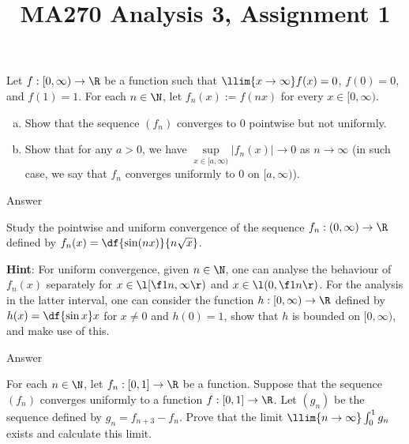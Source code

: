 \documentclass[a4paper]{article}
\title{MA270 Analysis 3, Assignment 1}
\begin{document}
\maketitle

\setlength{\parindent}{0em}
\setlength{\parskip}{1em}


\begin{questionbody}
Let $f : [0, \infty) \to \R$ be a function such that $\llim{x \to \infty} f(x) = 0$, $f(0) = 0$, and $f(1) = 1$. For each $n \in \N$, let $f_n(x) := f(nx)$ for every $x \in [0, \infty)$. %
\begin{enumerate}[(a)]
    \item Show that the sequence $(f_n)$ converges to 0 pointwise but not uniformly.
    \item Show that for any $a > 0$, we have $\sup\limits_{x \in [a, \infty)} |f_n(x)| \to 0$ as $n \to \infty$ (in such case, we say that $f_n$ converges uniformly to 0 on $[a, \infty)$). %
\end{enumerate}
\end{questionbody}

Answer



\begin{questionbody}
Study the pointwise and uniform convergence of the sequence $f_n : (0, \infty) \to \R$ defined by $f_n(x) = \df{\sin(nx)}{n \sqrt x}$.

\textbf{Hint}: For uniform convergence, given $n \in \N$, one can analyse the behaviour of $f_n(x)$ separately for $x \in \l[ \f1n, \infty \r)$ and $x \in \l( 0, \f1n \r)$. For the analysis in the latter interval, one can consider the function $h : [0, \infty) \to \R$ defined by $h(x) = \df{\sin x}x$ for $x \ne 0$ and $h(0) = 1$, show that $h$ is bounded on $[0, \infty)$, and make use of this. %
\end{questionbody}

Answer



\begin{questionbody}
For each $n \in \N$, let $f_n : [0, 1] \to \R$ be a function. Suppose that the sequence $(f_n)$ converges uniformly to a function $f : [0, 1] \to \R$. Let $(g_n)$ be the sequence defined by $g_n = f_{n+3} - f_n$. Prove that the limit $\llim{n \to \infty} \int_0^1 g_n$ exists and calculate this limit.
\end{questionbody}
\end{document}
